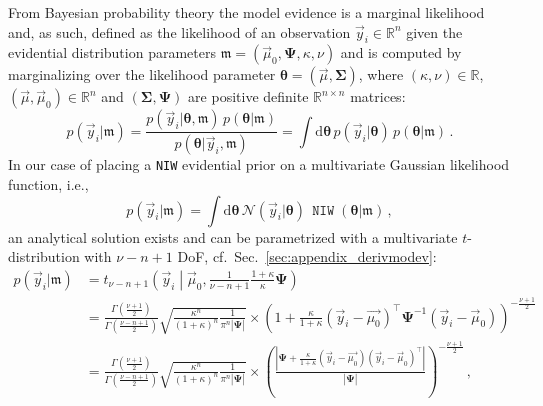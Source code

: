 \documentclass{article}
\begin{document}
From Bayesian probability theory the model evidence is a marginal likelihood and, as such, defined as the likelihood of an observation $\vec{y}_i \in \mathbb{R}^n$ given the evidential distribution parameters $\mathfrak{m}=(\vec{\mu}_0, \bm{\Psi}, \kappa, \nu)$ and is computed by marginalizing over the likelihood parameter $\bm{\theta} = (\vec{\mu}, \bm{\Sigma})$, where $(\kappa, \nu) \in \mathbb{R}$, $(\vec{\mu}, \vec{\mu}_0) \in \mathbb{R}^n$ and $(\bm{\Sigma}, \bm{\Psi})$ are positive definite $\mathbb{R}^{n \times n}$ matrices:
\begin{equation}
    \label{eq:modev1}
    p(\vec{y}_i | \mathfrak{m}) = \frac{p(\vec{y}_i | \bm{\theta}, \mathfrak{m}) \, p(\bm{\theta} | \mathfrak{m})}{p(\bm{\theta} | \vec{y}_i, \mathfrak{m})} = \int \! \mathrm{d} \bm{\theta} \, p(\vec{y}_i | \bm{\theta}) \, p(\bm{\theta} | \mathfrak{m}) \,.
\end{equation}
In our case of placing a \texttt{NIW} evidential prior on a multivariate Gaussian likelihood function, i.e.,
\begin{equation*}
    p(\vec{y}_i | \mathfrak{m}) = \int \! \mathrm{d} \bm{\theta} \, \mathcal{N}(\vec{y}_i | \bm{\theta}) \,  \operatorname{\texttt{NIW}}(\bm{\theta} | \mathfrak{m}) \,,
\end{equation*}
an analytical solution exists and can be parametrized with a multivariate $t$-distribution with $\nu - n + 1$ DoF, cf.\ Sec.~\ref{sec:appendix_derivmodev}:
\begin{subequations}
\begin{align}
    \label{eq:modev21}
    p(\vec{y}_i | \mathfrak{m}) &= t_{\nu-n+1} \left( \vec{y}_i \middle| \vec{\mu}_0, \frac{1}{\nu - n + 1} \frac{1 + \kappa}{\kappa} \bm{\Psi} \right) \\
    &= \frac{\Gamma\!\left( \frac{\nu + 1}{2} \right)}{\Gamma\!\left( \frac{\nu - n + 1}{2} \right)} \sqrt{ \frac{\kappa^n}{(1 + \kappa)^n} \frac{1}{\pi^n | \bm{\Psi} |}}
    \times \left( 1 + \frac{\kappa}{1 + \kappa} (\vec{y}_i - \vec{\mu_0})^\top \bm{\Psi}^{-1} (\vec{y}_i - \vec{\mu}_0) \right)^{-\frac{\nu + 1}{2}} \nonumber \\
    &= \frac{\Gamma\!\left( \frac{\nu + 1}{2} \right)}{\Gamma\!\left( \frac{\nu - n + 1}{2} \right)} \sqrt{ \frac{\kappa^n}{(1 + \kappa)^n} \frac{1}{\pi^n |\bm{\Psi}|}}
    \times \left( \frac{\left| \bm{\Psi} + \frac{\kappa}{1 + \kappa} (\vec{y}_i - \vec{\mu_0}) (\vec{y}_i - \vec{\mu}_0)^\top \right|}{|\bm{\Psi}|} \right)^{-\frac{\nu + 1}{2}} \,, \label{eq:modev22}
\end{align}
\end{subequations}
\end{document}
